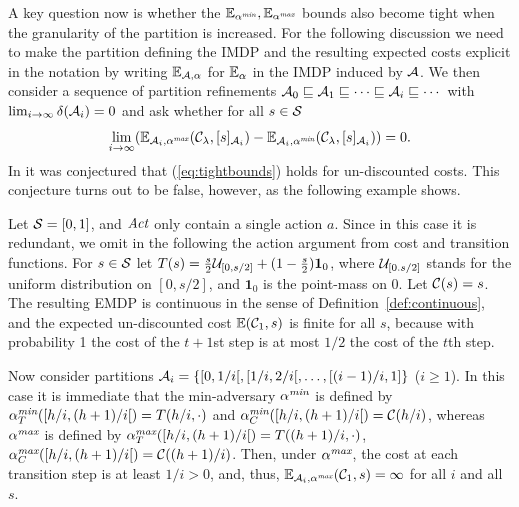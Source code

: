 \documentclass{llncs}
\begin{document}
A key question now is whether the $\mathbb{E}_{\alpha^{\emph{min}}},\mathbb{E}_{\alpha^{\emph{max}}}$ bounds also become tight 
when the granularity of the partition is increased. For the following discussion we need to make
the partition defining the IMDP and the resulting expected costs explicit in the notation by
writing  $\mathbb{E}_{\mathcal{A},\alpha}$ for $\mathbb{E}_\alpha$ in the IMDP induced by $\mathcal{A}$.
We then consider a sequence of partition refinements
$\mathcal{A}_0\sqsubseteq\mathcal{A}_1\sqsubseteq \cdots\sqsubseteq  \mathcal{A}_i\sqsubseteq\cdots$ with
$\lim_{i\rightarrow\infty}\delta(\mathcal{A}_i)= 0$ and ask whether for all $s\in\mathcal{S}$
\begin{equation}
\label{eq:tightbounds}
\lim_{i\rightarrow\infty} (\mathbb{E}_{\mathcal{A}_i,\alpha^{\emph{max}}}(\mathcal{C}_\lambda,[s]_{\mathcal{A}_i})-
\mathbb{E}_{\mathcal{A}_i,\alpha^{\emph{min}}}(\mathcal{C}_\lambda,[s]_{\mathcal{A}_i}))=0.
\end{equation}
In  \cite{jaeger2020approximating} it was conjectured that (\ref{eq:tightbounds}) holds for
un-discounted costs. 
This conjecture turns out to be false, however, as the following example shows.

\begin{example}
\label{ex:counterex}
Let $\mathcal{S}=[0,1]$, and $\mathit{Act}$ only contain a single action $a$. Since in this case it is redundant, we omit
in the following the action argument from cost and transition functions.
For $s\in \mathcal{S}$ let
$T(s)= \frac{s}{2}{\cal U}_{[0,s/2]} + (1-\frac{s}{2}){\boldsymbol 1}_0$, where $ {\cal U}_{[0.s/2]}$ stands for the
uniform distribution on $[0,s/2]$, and $ {\boldsymbol 1}_0$ is the point-mass on $0$. Let $\mathcal{C}(s)=s$.
The resulting EMDP is continuous in
the sense of Definition~\ref{def:continuous}, and the expected un-discounted cost
$\mathbb{E}(\mathcal{C}_1,s)$ is finite for all $s$, because with probability 1 the cost of the $t+1$st step
is at most $1/2$ the cost of the $t$th step. 

Now consider partitions $\mathcal{A}_i=\{ [0,1/i[,[1/i,2/i[,\ldots, [(i-1)/i,1] \}$ ($i\geq 1$).  In this case it is
immediate that the min-adversary $\alpha^{\emph{min}}$ is defined by $\alpha^{\emph{min}}_T([h/i,(h+1)/i[)=T(h/i,\cdot)$ and
$\alpha^{\emph{min}}_C([h/i,(h+1)/i[)=\mathcal{C}(h/i)$, whereas $\alpha^{\emph{max}}$ is defined by
 $\alpha^{\emph{max}}_T([h/i,(h+1)/i[)=T((h+1)/i,\cdot)$,
$\alpha^{\emph{max}}_C([h/i,(h+1)/i[)=\mathcal{C}((h+1)/i)$. Then, under $\alpha^{\emph{max}}$, the cost at each transition step
is at least $1/i>0$, and, thus, $\mathbb{E}_{\mathcal{A}_i,\alpha^{\emph{max}}}(\mathcal{C}_1,s)=\infty$ for all $i$ and all $s$.
\end{example}
\end{document}
